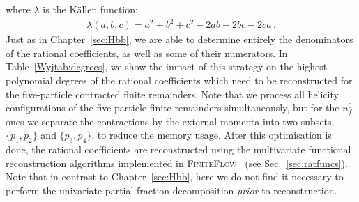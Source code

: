 \documentclass[main.tex]{subfiles}
\begin{document}
where $\lambda$ is the K\"allen function:
\begin{align}
\lambda(a,b,c) = a^2 + b^2 + c^2 - 2 a b - 2 b c - 2 c a \,.
\end{align}
Just as in Chapter~\ref{sec:Hbb}, we are able to determine entirely the denominators of the rational coefficients, as well as some of their numerators. In Table~\ref{Wyjtab:degrees}, we show the impact of this strategy on the highest polynomial degrees of the rational coefficients which need to be reconstructed for the five-particle contracted finite remainders. Note that we process all helicity configurations of the five-particle finite remainders simultaneously, but for the $n_f^0$ ones we separate the contractions by the external momenta into two subsets, $\{p_1,p_2\}$ and $\{p_3,p_4\}$, to reduce the memory usage. After this optimisation is done, the rational coefficients are reconstructed using the multivariate functional reconstruction algorithms implemented in \textsc{FiniteFlow}~\cite{Peraro:2019svx} (see Sec.~\ref{sec:ratfuncs}). Note that in contrast to Chapter~\ref{sec:Hbb}, here we do not find it necessary to perform the univariate partial fraction decomposition \textit{prior} to reconstruction.
\end{document}
